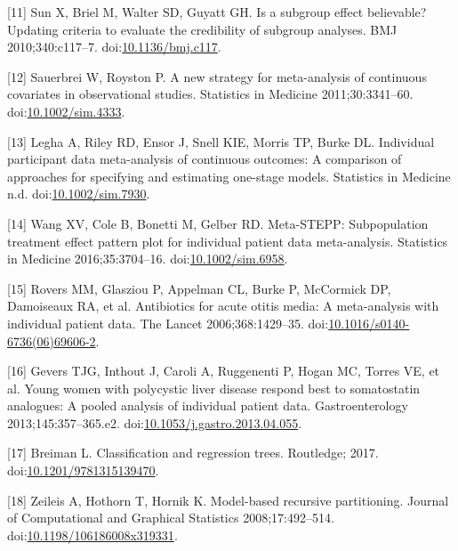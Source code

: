 \documentclass[14pt,]{article}
\begin{document}
\leavevmode\hypertarget{ref-Sun_2010}{}%
{[}11{]} Sun X, Briel M, Walter SD, Guyatt GH. Is a subgroup effect
believable? Updating criteria to evaluate the credibility of subgroup
analyses. BMJ 2010;340:c117--7.
doi:\href{https://doi.org/10.1136/bmj.c117}{10.1136/bmj.c117}.

\leavevmode\hypertarget{ref-Sauerbrei_2011}{}%
{[}12{]} Sauerbrei W, Royston P. A new strategy for meta-analysis of
continuous covariates in observational studies. Statistics in Medicine
2011;30:3341--60.
doi:\href{https://doi.org/10.1002/sim.4333}{10.1002/sim.4333}.

\leavevmode\hypertarget{ref-Legha_2018}{}%
{[}13{]} Legha A, Riley RD, Ensor J, Snell KIE, Morris TP, Burke DL.
Individual participant data meta-analysis of continuous outcomes: A
comparison of approaches for specifying and estimating one-stage models.
Statistics in Medicine n.d.
doi:\href{https://doi.org/10.1002/sim.7930}{10.1002/sim.7930}.

\leavevmode\hypertarget{ref-Wang_2016}{}%
{[}14{]} Wang XV, Cole B, Bonetti M, Gelber RD. Meta-STEPP:
Subpopulation treatment effect pattern plot for individual patient data
meta-analysis. Statistics in Medicine 2016;35:3704--16.
doi:\href{https://doi.org/10.1002/sim.6958}{10.1002/sim.6958}.

\leavevmode\hypertarget{ref-Rovers_2006}{}%
{[}15{]} Rovers MM, Glasziou P, Appelman CL, Burke P, McCormick DP,
Damoiseaux RA, et al. Antibiotics for acute otitis media: A
meta-analysis with individual patient data. The Lancet
2006;368:1429--35.
doi:\href{https://doi.org/10.1016/s0140-6736(06)69606-2}{10.1016/s0140-6736(06)69606-2}.

\leavevmode\hypertarget{ref-Gevers_2013}{}%
{[}16{]} Gevers TJG, Inthout J, Caroli A, Ruggenenti P, Hogan MC, Torres
VE, et al. Young women with polycystic liver disease respond best to
somatostatin analogues: A pooled analysis of individual patient data.
Gastroenterology 2013;145:357--365.e2.
doi:\href{https://doi.org/10.1053/j.gastro.2013.04.055}{10.1053/j.gastro.2013.04.055}.

\leavevmode\hypertarget{ref-Breiman_2017}{}%
{[}17{]} Breiman L. Classification and regression trees. Routledge;
2017.
doi:\href{https://doi.org/10.1201/9781315139470}{10.1201/9781315139470}.

\leavevmode\hypertarget{ref-Zeileis_2008}{}%
{[}18{]} Zeileis A, Hothorn T, Hornik K. Model-based recursive
partitioning. Journal of Computational and Graphical Statistics
2008;17:492--514.
doi:\href{https://doi.org/10.1198/106186008x319331}{10.1198/106186008x319331}.
\end{document}

